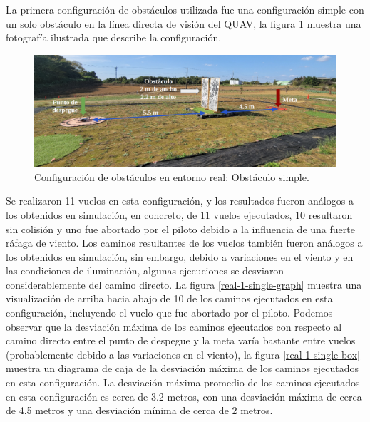 La primera configuración de obstáculos utilizada fue una configuración simple con un solo obstáculo en la línea directa de visión del QUAV, la figura \ref{real-1-single-0-setup} muestra una fotografía ilustrada que describe la configuración.

\begin{figure}[H]
    \centering
    \includegraphics[scale=0.22]{partes/img/real-1-single-0-setup.png}
    \caption[Configuración de obstáculos en entorno real: Obstáculo simple]{Configuración de obstáculos en entorno real: Obstáculo simple.}
    \label{real-1-single-0-setup}
\end{figure}

Se realizaron 11 vuelos en esta configuración, y los resultados fueron análogos a los obtenidos en simulación, en concreto, de 11 vuelos ejecutados, 10 resultaron sin colisión y uno fue abortado por el piloto debido a la influencia de una fuerte ráfaga de viento. Los caminos resultantes de los vuelos también fueron análogos a los obtenidos en simulación, sin embargo, debido a variaciones en el viento y en las condiciones de iluminación, algunas ejecuciones se desviaron considerablemente del camino directo. La figura \ref{real-1-single-graph} muestra una visualización de arriba hacia abajo de 10 de los caminos ejecutados en esta configuración, incluyendo el vuelo que fue abortado por el piloto. Podemos observar que la desviación máxima de los caminos ejecutados con respecto al camino directo entre el punto de despegue y la meta varía bastante entre vuelos (probablemente debido a las variaciones en el viento), la figura \ref{real-1-single-box} muestra un diagrama de caja de la desviación máxima de los caminos ejecutados en esta configuración. La desviación máxima promedio de los caminos ejecutados en esta configuración es cerca de 3.2 metros, con una desviación máxima de cerca de 4.5 metros y una desviación mínima de cerca de 2 metros.

